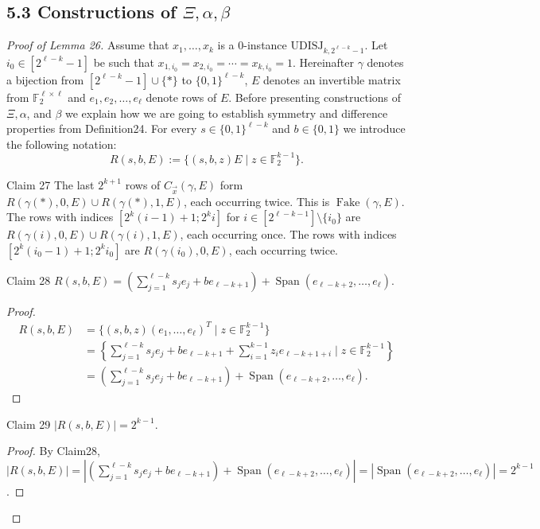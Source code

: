 \subsection*{5.3 Constructions of $\Xi,\alpha,\beta$}
\begin{proof}[Proof of Lemma 26]
Assume that $x_1,\ldots,x_k$ is a 0-instance $\mathrm{UDISJ}_{k,2^{\ell-k}-1}$. Let $i_0\in[2^{\ell-k}-1]$ be such that $x_{1,i_0}=x_{2,i_0}=\cdots=x_{k,i_0}=1$. Hereinafter $\gamma$ denotes a bijection from $[2^{\ell-k}-1]\cup\{*\}$ to $\{0,1\}^{\ell-k}$, $E$ denotes an invertible matrix from $\mathbb F_2^{\ell\times\ell}$ and $e_1,e_2,\ldots,e_\ell$ denote rows of $E$. Before presenting constructions of $\Xi,\alpha$, and $\beta$ we explain how we are going to establish symmetry and difference properties from Definition24. For every $s\in\{0,1\}^{\ell-k}$ and $b\in\{0,1\}$ we introduce the following notation:
\[
R(s,b,E):=\{(s,b,z)E\mid z\in\mathbb F_2^{k-1}\}.
\]
\begin{authorclaim}{Claim 27}
The last $2^{k+1}$ rows of $C_{\vec x}(\gamma,E)$ form $R(\gamma(*),0,E)\cup R(\gamma(*),1,E)$, each occurring twice. This is $\operatorname{Fake}(\gamma,E)$.
The rows with indices $[2^k(i-1)+1;2^ki]$ for $i\in[2^{\ell-k-1}]\setminus\{i_0\}$ are $R(\gamma(i),0,E)\cup R(\gamma(i),1,E)$, each occurring once.
The rows with indices $[2^k(i_0-1)+1;2^ki_0]$ are $R(\gamma(i_0),0,E)$, each occurring twice.
\end{authorclaim}
\begin{authorclaim}{Claim 28}
$R(s,b,E)=(\sum_{j=1}^{\ell-k}s_je_j+be_{\ell-k+1})+\operatorname{Span}(e_{\ell-k+2},\ldots,e_\ell)$.
\end{authorclaim}
\begin{proof}
\begin{align*}
R(s,b,E)&=\{(s,b,z)(e_1,\ldots,e_\ell)^T\mid z\in\mathbb F_2^{k-1}\}\\
&=\left\{\sum_{j=1}^{\ell-k}s_je_j+be_{\ell-k+1}+\sum_{i=1}^{k-1}z_ie_{\ell-k+1+i}\mid z\in\mathbb F_2^{k-1}\right\}\\
&=\left(\sum_{j=1}^{\ell-k}s_je_j+be_{\ell-k+1}\right)+\operatorname{Span}(e_{\ell-k+2},\ldots,e_\ell).
\end{align*}
\end{proof}
\begin{authorclaim}{Claim 29}
$|R(s,b,E)|=2^{k-1}$.
\end{authorclaim}
\begin{proof}
By Claim28, $|R(s,b,E)|=|(\sum_{j=1}^{\ell-k}s_je_j+be_{\ell-k+1})+\operatorname{Span}(e_{\ell-k+2},\ldots,e_\ell)|=|\operatorname{Span}(e_{\ell-k+2},\ldots,e_\ell)|=2^{k-1}$.

\end{proof}
\end{proof}
